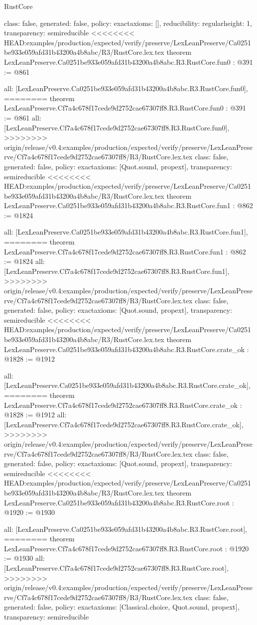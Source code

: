 \begin{lexlean}{RustCore}
\begin{coremodule}
{\begin{coremodule}
{{{  class: false,
  generated: false,
  policy: exact{axioms: []},
  reducibility: regular{height: 1},
  transparency: semireducible
}
<<<<<<<< HEAD:examples/production/expected/verify/preserve/LexLeanPreserve/Ca0251be933e059afd31b43200a4b8abc/R3/RustCore.lex.tex
theorem LexLeanPreserve.Ca0251be933e059afd31b43200a4b8abc.R3.RustCore.fun0 : @391 := @861 {
  all: [LexLeanPreserve.Ca0251be933e059afd31b43200a4b8abc.R3.RustCore.fun0],
========
theorem LexLeanPreserve.Cf7a4c678f17cede9d2752cae67307ff8.R3.RustCore.fun0 : @391 := @861 {
  all: [LexLeanPreserve.Cf7a4c678f17cede9d2752cae67307ff8.R3.RustCore.fun0],
>>>>>>>> origin/release/v0.4:examples/production/expected/verify/preserve/LexLeanPreserve/Cf7a4c678f17cede9d2752cae67307ff8/R3/RustCore.lex.tex
  class: false,
  generated: false,
  policy: exact{axioms: [Quot.sound, propext]},
  transparency: semireducible
}
<<<<<<<< HEAD:examples/production/expected/verify/preserve/LexLeanPreserve/Ca0251be933e059afd31b43200a4b8abc/R3/RustCore.lex.tex
theorem LexLeanPreserve.Ca0251be933e059afd31b43200a4b8abc.R3.RustCore.fun1 : @862 := @1824 {
  all: [LexLeanPreserve.Ca0251be933e059afd31b43200a4b8abc.R3.RustCore.fun1],
========
theorem LexLeanPreserve.Cf7a4c678f17cede9d2752cae67307ff8.R3.RustCore.fun1 : @862 := @1824 {
  all: [LexLeanPreserve.Cf7a4c678f17cede9d2752cae67307ff8.R3.RustCore.fun1],
>>>>>>>> origin/release/v0.4:examples/production/expected/verify/preserve/LexLeanPreserve/Cf7a4c678f17cede9d2752cae67307ff8/R3/RustCore.lex.tex
  class: false,
  generated: false,
  policy: exact{axioms: [Quot.sound, propext]},
  transparency: semireducible
}
<<<<<<<< HEAD:examples/production/expected/verify/preserve/LexLeanPreserve/Ca0251be933e059afd31b43200a4b8abc/R3/RustCore.lex.tex
theorem LexLeanPreserve.Ca0251be933e059afd31b43200a4b8abc.R3.RustCore.crate_ok : @1828 := @1912 {
  all: [LexLeanPreserve.Ca0251be933e059afd31b43200a4b8abc.R3.RustCore.crate_ok],
========
theorem LexLeanPreserve.Cf7a4c678f17cede9d2752cae67307ff8.R3.RustCore.crate_ok : @1828 := @1912 {
  all: [LexLeanPreserve.Cf7a4c678f17cede9d2752cae67307ff8.R3.RustCore.crate_ok],
>>>>>>>> origin/release/v0.4:examples/production/expected/verify/preserve/LexLeanPreserve/Cf7a4c678f17cede9d2752cae67307ff8/R3/RustCore.lex.tex
  class: false,
  generated: false,
  policy: exact{axioms: [Quot.sound, propext]},
  transparency: semireducible
}
<<<<<<<< HEAD:examples/production/expected/verify/preserve/LexLeanPreserve/Ca0251be933e059afd31b43200a4b8abc/R3/RustCore.lex.tex
theorem LexLeanPreserve.Ca0251be933e059afd31b43200a4b8abc.R3.RustCore.root : @1920 := @1930 {
  all: [LexLeanPreserve.Ca0251be933e059afd31b43200a4b8abc.R3.RustCore.root],
========
theorem LexLeanPreserve.Cf7a4c678f17cede9d2752cae67307ff8.R3.RustCore.root : @1920 := @1930 {
  all: [LexLeanPreserve.Cf7a4c678f17cede9d2752cae67307ff8.R3.RustCore.root],
>>>>>>>> origin/release/v0.4:examples/production/expected/verify/preserve/LexLeanPreserve/Cf7a4c678f17cede9d2752cae67307ff8/R3/RustCore.lex.tex
  class: false,
  generated: false,
  policy: exact{axioms: [Classical.choice, Quot.sound, propext]},
  transparency: semireducible
}

}}}}}}
\end{coremodule}}
\end{coremodule}
\end{lexlean}
